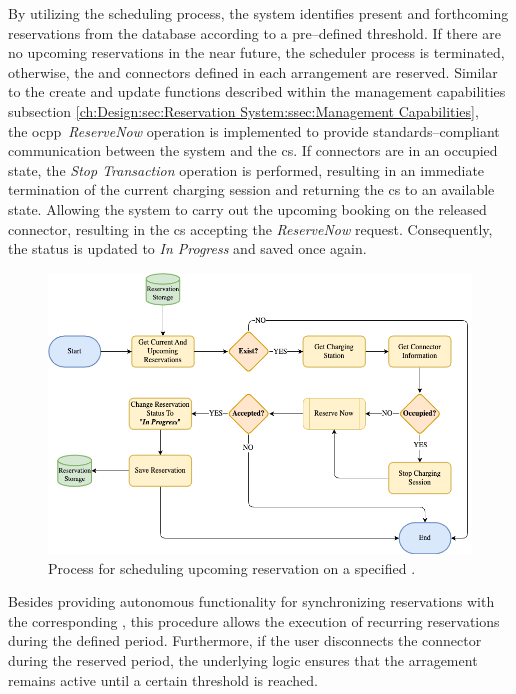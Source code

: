 By utilizing the scheduling process, the system identifies present and forthcoming reservations from the database according to a pre--defined threshold. 
If there are no upcoming reservations in the near future, the scheduler process is terminated, otherwise, the  and connectors defined in each arrangement are reserved.
Similar to the create and update functions described within the management capabilities subsection \ref{ch:Design:sec:Reservation System:ssec:Management Capabilities}, \\ the \acrshort{ocpp}~\textit{ReserveNow} operation \cite{noauthor_ocpp_nodate} is implemented to provide standards--compliant communication between the system and the \acrshort{cs}.
If connectors are in an occupied state, the \textit{Stop Transaction} operation is performed, resulting in an immediate termination of the current charging session and returning the \acrshort{cs} to an available state.
Allowing the system to carry out the upcoming booking on the released connector, resulting in the \acrshort{cs} accepting the \textit{ReserveNow} request.
Consequently, the status is updated to \textit{In Progress} and saved once again.

\begin{figure}[h]
    \centering
    \includegraphics[scale=0.4]{resources/images/main/5_design/processes/scheduler/SynchronizeReservation.png}
    \caption{Process for scheduling upcoming reservation on a specified .}
    \label{fig:schedule-reservation-flowchart}
\end{figure}

\noindent Besides providing autonomous functionality for synchronizing reservations with the corresponding , this procedure allows the execution of recurring reservations during the defined period. 
Furthermore, if the user disconnects the connector during the reserved period, the underlying logic ensures that the arragement remains active until a certain threshold is reached.

